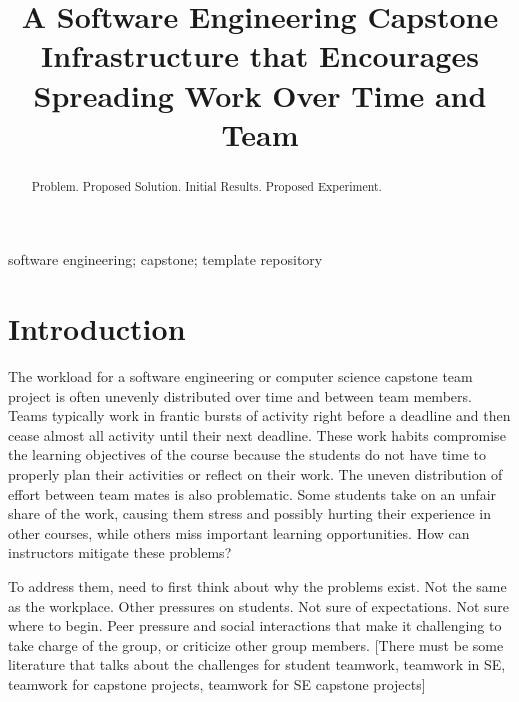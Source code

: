 \documentclass[10pt, conference]{IEEEtran}
\begin{document}
\title{A Software Engineering Capstone Infrastructure that Encourages Spreading
Work Over Time and Team}

\author{
}

\maketitle
  
\begin{abstract}

Problem. Proposed Solution. Initial Results. Proposed Experiment.

\end{abstract}

\begin{IEEEkeywords}
software engineering; capstone; template repository
\end{IEEEkeywords}

\section{Introduction} \label{SecIntro}

The workload for a software engineering or computer science capstone team
project is often unevenly distributed over time and between team members.  Teams
typically work in frantic bursts of activity right before a deadline and then
cease almost all activity until their next deadline.  These work habits
compromise the learning objectives of the course because the students do not
have time to properly plan their activities or reflect on their work.  The
uneven distribution of effort between team mates is also problematic.  Some
students take on an unfair share of the work, causing them stress and possibly
hurting their experience in other courses, while others miss important learning
opportunities.  How can instructors mitigate these problems?

To address them, need to first think about why the problems exist.  Not the same
as the workplace.  Other pressures on students.  Not sure of expectations.  Not
sure where to begin.  Peer pressure and social interactions that make it
challenging to take charge of the group, or criticize other group members.
[There must be some literature that talks about the challenges for student
teamwork, teamwork in SE, teamwork for capstone projects, teamwork for SE
capstone projects]
\end{document}
